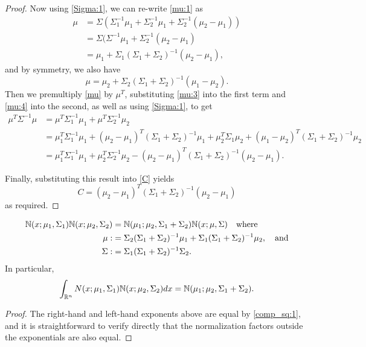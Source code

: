 \documentclass[12pt,leqno]{article}
\begin{document}
\begin{proof}
Now using \eqref{Sigma:1}, we can re-write \eqref{mu:1} as  
\begin{equation}\label{mu:3}
  \begin{split}
  \mu &= \Sigma(\Sigma_1^{-1}\mu_1 + \Sigma_2^{-1}\mu_1 +\Sigma_2^{-1}(\mu_2-\mu_1)) \\
  &= \Sigma(\Sigma^{-1}\mu_1 + \Sigma_2^{-1}(\mu_2-\mu_1) \\
  &= \mu_1 + \Sigma_1(\Sigma_1+\Sigma_2)^{-1}(\mu_2-\mu_1),
  \end{split}
  \end{equation}
and by symmetry, we also have 
\begin{equation}\label{mu:4}
  \mu = \mu_2 + \Sigma_2(\Sigma_1+\Sigma_2)^{-1}(\mu_1-\mu_2).
\end{equation}
Then we premultiply \eqref{mu} by $\mu^T$, substituting \eqref{mu:3} into the first term and
  \eqref{mu:4} into the second, as well as using \eqref{Sigma:1}, to get 
\begin{align*}
    \mu^T\Sigma^{-1}\mu &= \mu^T\Sigma_1^{-1}\mu_1 + \mu^T\Sigma_2^{-1}\mu_2 \\
    &= \mu_1^T\Sigma_1^{-1}\mu_1 + (\mu_2-\mu_1)^T(\Sigma_1+\Sigma_2)^{-1}\mu_1
    +\mu_2^T\Sigma_1\mu_2 + (\mu_1-\mu_2)^T(\Sigma_1+\Sigma_2)^{-1}\mu_2\\
    &= \mu_1^T\Sigma_1^{-1}\mu_1 + \mu_2^T\Sigma_2^{-1}\mu_2 - (\mu_2-\mu_1)^T(\Sigma_1+\Sigma_2)^{-1}(\mu_2-\mu_1).
\end{align*}

Finally, substituting this result into \eqref{C} yields
\begin{equation}\label{C:1}
  C = (\mu_2-\mu_1)^T(\Sigma_1+\Sigma_2)^{-1}(\mu_2-\mu_1)
\end{equation}
as required.
\end{proof}

\begin{Cor}
\begin{align}
  {\mathbb N}(x;\mu_1,\Sigma_1){\mathbb N}(x;\mu_2,\Sigma_2) &= {\mathbb N}(\mu_1;\mu_2,\Sigma_1+\Sigma_2)
  {\mathbb N}(x;\mu,\Sigma) \quad\text{where}\label{comp_sq:2}\\
 \mu :&= \Sigma_2(\Sigma_1+\Sigma_2)^{-1}\mu_1+\Sigma_1(\Sigma_1+\Sigma_2)^{-1}\mu_2, \quad\text{and}\notag\\
 \Sigma :&= \Sigma_1(\Sigma_1 + \Sigma_2)^{-1}\Sigma_2.\notag
\end{align}
In particular,
\begin{equation}\label{int_prod}
  \int_{{\mathbb R}^n}N(x;\mu_1,\Sigma_1){\mathbb N}(x;\mu_2,\Sigma_2)dx = {\mathbb N}(\mu_1;\mu_2,\Sigma_1+\Sigma_2).
  \end{equation}
\begin{proof}
  The right-hand and left-hand exponents above are equal by \eqref{comp_sq:1}, and it is
  straightforward to verify directly that the normalization factors outside the exponentials are also equal. 
\end{proof}
\end{Cor}
\end{document}
